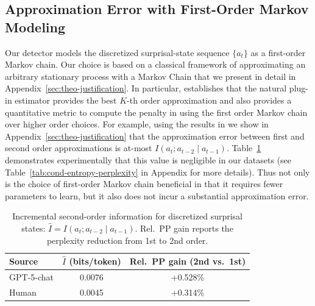 \documentclass{article}
\theoremstyle{plain}
\theoremstyle{definition}
\theoremstyle{remark}
\begin{document}
\subsection{Approximation Error with First-Order Markov Modeling} \label{sec:theoretical-Justification-fo-Markov}


Our detector models the discretized surprisal-state sequence $\{a_t\}$ as a first-order Markov chain. Our choice is based on a classical framework of approximating an arbitrary stationary process with a Markov Chain \citep{gray2011entropy} that we present in detail in Appendix~\ref{sec:theo-justification}. In particular, \citep{gray2011entropy} establishes that the natural plug-in estimator provides the best $K$-th order approximation and also provides a quantitative metric to compute the penalty in using the first order Markov chain over higher order choices. For example, using the results in \citep{gray2011entropy} we show in Appendix~\ref{sec:theo-justification} that the approximation error between first and second order approximations is at-most  $I(a_t; a_{t-2} \mid a_{t-1})$. Table~\ref{tab:cond-entropy-perplexity-2} demonstrates experimentally that this value is negligible in our datasets (see Table~\ref{tab:cond-entropy-perplexity} in Appendix for more details). Thus not only is the choice of first-order Markov chain beneficial in that it requires fewer parameters to learn, but it also does not incur a substantial approximation error. 

\begin{table}[htbp]
\centering
{\scriptsize
\setlength{\tabcolsep}{5pt}
\begin{tabular}{l c c}
\toprule
Source & $\hat I$ (bits/token) & Rel.\ PP gain (2nd vs.\ 1st) \\
\midrule
GPT-5-chat & 0.0076 & +0.528\% \\
Human      & 0.0045 & +0.314\% \\
\bottomrule
\end{tabular}}
\caption{Incremental second-order information for discretized surprisal states: $\hat I= I(a_t;a_{t-2}\mid a_{t-1})$. Rel.\ PP gain reports the perplexity reduction from 1st to 2nd order.}
\label{tab:cond-entropy-perplexity-2}
\end{table}
\end{document}
